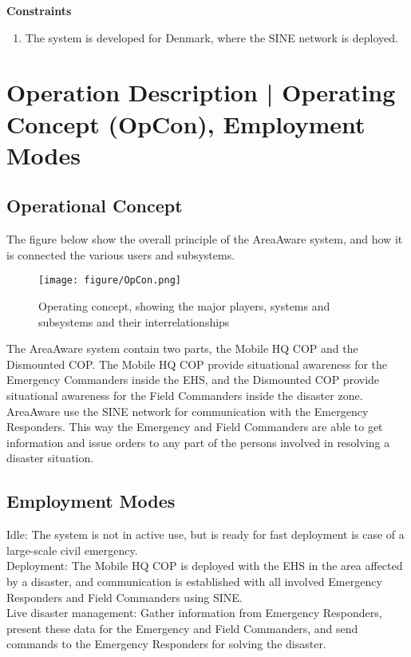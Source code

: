 \noindent \textbf{Constraints}
\begin{enumerate}
	\item The system is developed for Denmark, where the SINE network is deployed.
\end{enumerate}

\section{Operation Description | Operating Concept (OpCon), Employment Modes}

\subsection{Operational Concept}
The figure below show the overall principle of the AreaAware system, and how it is connected the various users and subsystems.

\begin{figure}[ht]
	\centering
	\texttt{[image: figure/OpCon.png]}
	\caption{Operating concept, showing the major players, systems and subsystems and their interrelationships}
	\label{fig:OpCon}
\end{figure}

\FloatBarrier

The AreaAware system contain two parts, the Mobile HQ COP and the Dismounted COP. The Mobile HQ COP provide situational awareness for the Emergency Commanders inside the EHS, and the Dismounted COP provide situational awareness for the Field Commanders inside the disaster zone. AreaAware use the SINE network for communication with the Emergency Responders. This way the Emergency and Field Commanders are able to get information and issue orders to any part of the persons involved in resolving a disaster situation.

\subsection{Employment Modes}
Idle: The system is not in active use, but is ready for fast deployment is case of a large-scale civil emergency.\\

\noindent Deployment: The Mobile HQ COP is deployed with the EHS in the area affected by a disaster, and communication is established with all involved Emergency Responders and Field Commanders using SINE.\\
 
\noindent Live disaster management: Gather information from Emergency Responders, present these data for the Emergency and Field Commanders, and send commands to the Emergency Responders for solving the disaster.\\

